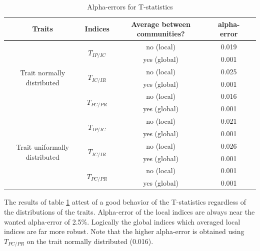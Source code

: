 \documentclass[12pt]{article}\usepackage[]{graphicx}\usepackage[]{color}
\begin{document}
\begin{table}[h!]
\begin{center}
\caption{Alpha-errors for T-statistics}
\label{tab:Alpha-errors_for_T-stats}
\begin{tabular}{|c|c|c|c|c|}
\hline
Traits & Indices & Average between communities? & alpha-error \tabularnewline
\hline \hline \hline
\multirow{6}{*}{Trait normally distributed} & \multirow{2}{*}{$T_{IP/IC}$} & no (local) & 0.019 \tabularnewline
\cline{3-4} 
 & & yes (global) & 0.001 \tabularnewline
\cline{2-4} 
 & \multirow{2}{*}{$T_{IC/IR}$} & no (local) & 0.025 \tabularnewline
\cline{3-4} 
 & & yes (global) & 0.001 \tabularnewline
\cline{2-4} 
 & \multirow{2}{*}{$T_{PC/PR}$} & no (local) & 0.016 \tabularnewline
\cline{3-4}
 & & yes (global)& 0.001 \tabularnewline

\hline \hline \hline

\multirow{6}{*}{Trait uniformally distributed} & \multirow{2}{*}{$T_{IP/IC}$} & no (local) & 0.021 \tabularnewline
\cline{3-4}
 & & yes (global) &  0.001 \tabularnewline
\cline{2-4} 
 & \multirow{2}{*}{$T_{IC/IR}$} & no (local) & 0.026 \tabularnewline
\cline{3-4} 
 & & yes (global) &  0.001 \tabularnewline
\cline{2-4} 
 & \multirow{2}{*}{$T_{PC/PR}$} & no (local) & 0.001 \tabularnewline
\cline{3-4} 
 & & yes (global)&  0.001 \tabularnewline
\hline 
\end{tabular}
\end{center}
\end{table}



The results of table \ref{tab:Alpha-errors_for_T-stats} attest of a good behavior of the T-statistics regardless of the distributions of the traits. Alpha-error of the local indices are always near the wanted alpha-error of 2.5\%. Logically the global indices which averaged local indices are far more robust. Note that the higher alpha-error is obtained using $T_{PC/PR}$ on the trait normally distributed (0.016).
\end{document}
